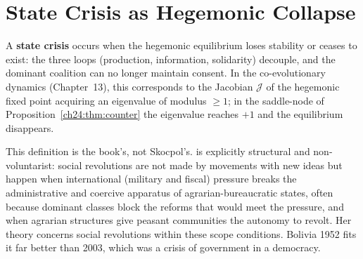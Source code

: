 \documentclass[../structural_economics_book.tex]{subfiles}
\begin{document}
\section{State Crisis as Hegemonic Collapse}
\label{ch24:sec:crisis}

\begin{definition}\label{ch24:def:crisis}
A \textbf{state crisis} occurs when the hegemonic equilibrium loses stability or ceases to exist: the three loops (production, information, solidarity) decouple, and the dominant coalition can no longer maintain consent. In the co-evolutionary dynamics (Chapter~13), this corresponds to the Jacobian $\mathcal{J}$ of the hegemonic fixed point acquiring an eigenvalue of modulus $\ge 1$; in the saddle-node of Proposition~\ref{ch24:thm:counter} the eigenvalue reaches $+1$ and the equilibrium disappears.
\end{definition}

This definition is the book's, not Skocpol's. \citet{skocpol1979states} is explicitly structural and non-voluntarist: social revolutions are not made by movements with new ideas but happen when international (military and fiscal) pressure breaks the administrative and coercive apparatus of agrarian-bureaucratic states, often because dominant classes block the reforms that would meet the pressure, and when agrarian structures give peasant communities the autonomy to revolt. Her theory concerns social revolutions within these scope conditions. Bolivia 1952 fits it far better than 2003, which was a crisis of government in a democracy.
\end{document}
